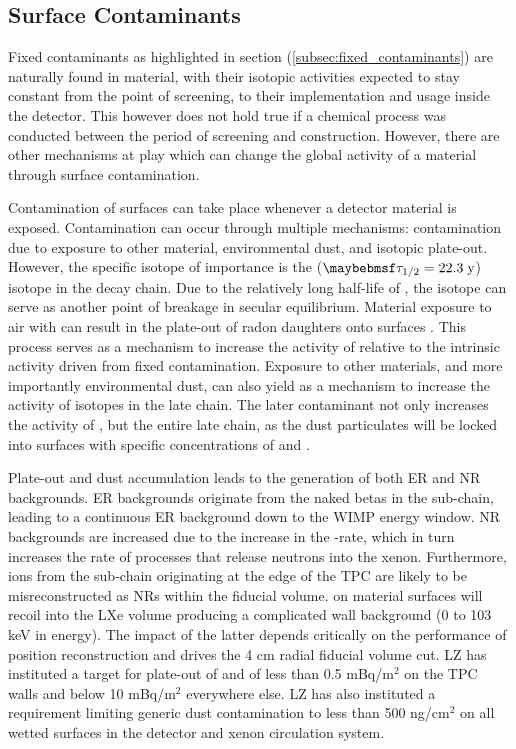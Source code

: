 \subsection{Surface Contaminants}
\label{subsec:surface_contaminants}

Fixed contaminants as highlighted in section (\ref{subsec:fixed_contaminants}) are naturally found in material, with their isotopic activities expected to stay constant from the point of screening, to their implementation and usage inside the detector. This however does not hold true if a chemical process was conducted between the period of screening and construction. However, there are other mechanisms at play which can change the global activity of a material through surface contamination.

Contamination of surfaces can take place whenever a detector material is exposed. Contamination can occur through multiple mechanisms: contamination due to exposure to other material, environmental dust, and isotopic plate-out. However, the specific isotope of importance is the \PbTOZ{} ($\tau_{1/2} = 22.3 \; \MathText{y}$) isotope in the \UTTE{} decay chain. Due to the relatively long half-life of \PbTOZ{}, the isotope can serve as another point of breakage in secular equilibrium. Material exposure to air with \RnTTT{} can result in the plate-out of radon daughters onto surfaces \cite{Bruemmer_2015, Stein_2018}. This process serves as a mechanism to increase the activity of \PbTOZ{} relative to the intrinsic activity driven from fixed contamination. Exposure to other materials, and more importantly environmental dust, can also yield as a mechanism to increase the activity of isotopes in the late chain. The later contaminant not only increases the activity of \PbTOZ{}, but the entire late chain, as the dust particulates will be locked into surfaces with specific concentrations of \UTTE{} and \ThTTT{}.

Plate-out and dust accumulation leads to the generation of both ER and NR backgrounds. ER backgrounds originate from the \PbTOF{} naked betas in the \RnTTT{} sub-chain, leading to a continuous ER background down to the WIMP energy window. NR backgrounds are increased due to the increase in the \alpha-rate, which in turn increases the rate of \alphaN{} processes that release neutrons into the xenon. Furthermore, \PoTOZ{} ions from the \PbTOZ{} sub-chain originating at the edge of the TPC are likely to be misreconstructed as NRs within the fiducial volume. \PoTOZ{} on material surfaces will recoil into the LXe volume producing a complicated wall background (0 to 103 keV in energy). The impact of the latter depends critically on the performance of position reconstruction and drives the 4 cm radial fiducial volume cut. LZ has instituted a target for plate-out of \PbTOZ{} and \PoTOZ{} of less than 0.5 mBq/m$^{2}$ on the TPC walls and below 10 mBq/m$^{2}$ everywhere else. LZ has also instituted a requirement limiting generic dust contamination to less than 500 ng/cm$^{2}$ on all wetted surfaces in the detector and xenon circulation system. 


